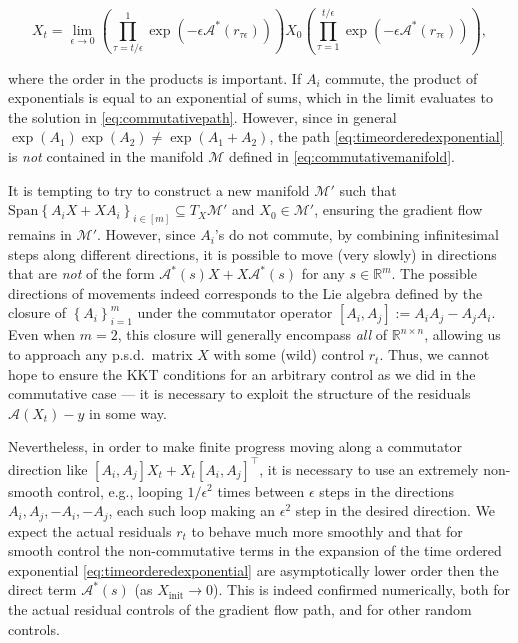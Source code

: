 \begin{equation} \label{eq:timeorderedexponential} X_t =
  \lim_{\epsilon\to0} \left(\prod_{\tau=t/\epsilon}^1 \exp\left(-
    \epsilon\mathcal{A}^*(r_{\tau\epsilon}) \right)
  \right)X_0\left(\prod_{\tau=1}^{t/\epsilon} \exp\left(-
    \epsilon\mathcal{A}^*(r_{\tau\epsilon}) \right)\right),
\end{equation}

where the order in the products is important.  If  $A_i$ commute, the product of exponentials is equal to an exponential of sums, which in the limit evaluates to the solution in \eqref{eq:commutativepath}. However, since in general $\exp(A_1)\exp(A_2) \neq
\exp(A_1+A_2)$,
the path \eqref{eq:timeorderedexponential} is \emph{not} contained in the manifold $\mathcal{M}$ defined in \eqref{eq:commutativemanifold}.

It is tempting to try to construct a new manifold $\mathcal{M}'$ such that
$\textrm{Span}\left\{A_iX + XA_i\right\}_{i\in[m]}
\subseteq T_X\mathcal{M}'$ and $X_0 \in \mathcal{M}'$, ensuring the gradient flow remains in
$\mathcal{M}'$. However, since  $A_i$'s do not commute, by combining infinitesimal steps along different directions, it is possible to move (very slowly) in directions that are \emph{not} of the form $\mathcal{A}^*(s)X + X\mathcal{A}^*(s)$ for any $s \in \mathbb{R}^m$. The possible directions of movements indeed corresponds to the Lie algebra defined by the closure of $\left\{A_i\right\}_{i=1}^m$ under the commutator operator $[A_i,A_j] := A_iA_j - A_jA_i$. Even when $m=2$, this closure will generally encompass \emph{all} of $\mathbb{R}^{n\times n}$, allowing us to approach any p.s.d.~matrix $X$ with some (wild) control $r_t$. Thus, we cannot hope to ensure the KKT conditions for an arbitrary control as we did in the commutative case --- it is necessary to exploit the structure of the residuals $\mathcal{A}(X_t) - y$ in some way.

Nevertheless, in order to make finite progress moving along a commutator direction like $[A_i,A_j]X_t +
X_t[A_i,A_j]^\top$, it is necessary to use an extremely non-smooth control, e.g., looping $1/\epsilon^2$ times between $\epsilon$ steps in the directions $A_i,A_j,-A_i,-A_j$, each such loop making an $\epsilon^2$
step in the desired direction.  We expect the actual residuals $r_t$ to behave much more smoothly and that for smooth control the non-commutative terms in the expansion of the time ordered exponential
\eqref{eq:timeorderedexponential} are asymptotically lower order then the direct term
$\mathcal{A}^*(s)$ (as $X_{\textrm{init}} \rightarrow 0$).  This is indeed confirmed numerically, both for the actual residual controls of the gradient flow path, and for other random controls.

